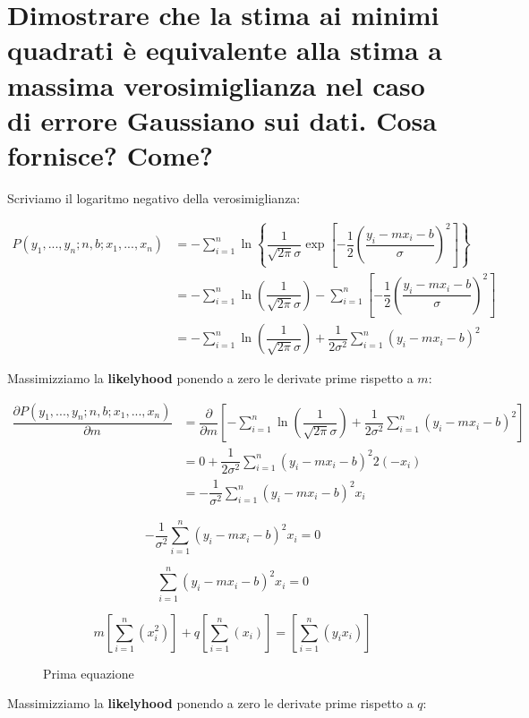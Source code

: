 \documentclass[\main/main.tex]{subfiles}
\begin{document}
\section{Dimostrare che la stima ai minimi quadrati è equivalente alla stima a massima verosimiglianza nel caso di errore Gaussiano sui dati. Cosa fornisce? Come?}
Scriviamo il logaritmo negativo della verosimiglianza:

\begin{align}
P \left(y_1,...,y_n; n, b; x_1, ..., x_n \right)  &=
	- \sum_{i=1}^n 
	\ln \left\{
		\dfrac{1}{\sqrt{2\pi}\sigma}
		\exp \left[
		-\dfrac{1}{2}	\left(\dfrac{ y_i - mx_i - b}{\sigma} \right)^2
	 	\right]
	 \right\}\\
	 &= 
	 - \sum_{i=1}^n \ln
	 \left ( \dfrac{1}{\sqrt{2\pi}\sigma} \right )
	 - \sum_{i=1}^n
		\left[
		-\dfrac{1}{2}	\left(\dfrac{ y_i - mx_i - b}{\sigma} \right)^2
	 	\right]\\
	 &= 
	 - \sum_{i=1}^n \ln
	 \left ( \dfrac{1}{\sqrt{2\pi}\sigma} \right )
	 + \dfrac{1}{2\sigma^2} \sum_{i=1}^n
		\left(y_i - mx_i - b \right)^2
\end{align}

Massimizziamo la \textbf{likelyhood} ponendo a zero le derivate prime rispetto a $m$:

\begin{align}
	\dfrac{\partial P \left(y_1,...,y_n; n, b; x_1, ..., x_n \right)}{\partial m}  &= \dfrac{\partial}{\partial m} \left [ - \sum_{i=1}^n \ln
	 \left ( \dfrac{1}{\sqrt{2\pi}\sigma} \right )
	 + \dfrac{1}{2\sigma^2} \sum_{i=1}^n
		\left(y_i - mx_i - b \right)^2
	 	 \right ]\\
	 &= 0 + \dfrac{1}{2\sigma^2} \sum_{i=1}^n \left(y_i - mx_i - b \right)^2 2 (-x_i)\\
	 &= -\dfrac{1}{\sigma^2} \sum_{i=1}^n \left(y_i - mx_i - b \right)^2  x_i
\end{align}

\[
	-\dfrac{1}{\sigma^2} \sum_{i=1}^n \left(y_i - mx_i - b \right)^2  x_i = 0
\]

\[
	\sum_{i=1}^n \left(y_i - mx_i - b \right)^2  x_i = 0
\]

\begin{figure}[H]
\[
	m\left [ \sum_{i=1}^n \left(x_i^2 \right) \right ] + q \left [ \sum_{i=1}^n \left(x_i \right) \right ] = \left [ \sum_{i=1}^n \left(y_i x_i \right) \right ]
\]
\caption{Prima equazione}
\end{figure}

Massimizziamo la \textbf{likelyhood} ponendo a zero le derivate prime rispetto a $q$:
\end{document}
